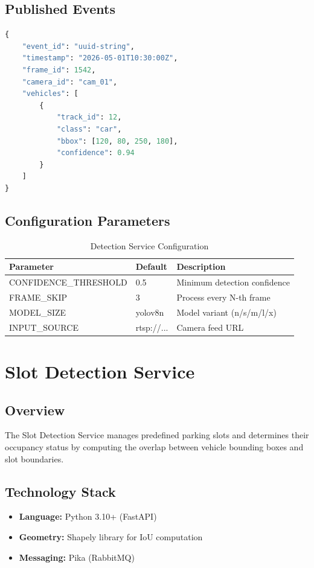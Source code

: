 \documentclass[12pt,a4paper]{report}
\begin{document}
\subsection{Published Events}
\begin{lstlisting}[language=Python, caption=vehicle.detected.v1 Event Schema]
{
    "event_id": "uuid-string",
    "timestamp": "2026-05-01T10:30:00Z",
    "frame_id": 1542,
    "camera_id": "cam_01",
    "vehicles": [
        {
            "track_id": 12,
            "class": "car",
            "bbox": [120, 80, 250, 180],
            "confidence": 0.94
        }
    ]
}
\end{lstlisting}

\subsection{Configuration Parameters}
\begin{table}[H]
\centering
\caption{Detection Service Configuration}
\begin{tabular}{|l|l|l|}
\hline
\textbf{Parameter} & \textbf{Default} & \textbf{Description} \\
\hline
CONFIDENCE\_THRESHOLD & 0.5 & Minimum detection confidence \\
\hline
FRAME\_SKIP & 3 & Process every N-th frame \\
\hline
MODEL\_SIZE & yolov8n & Model variant (n/s/m/l/x) \\
\hline
INPUT\_SOURCE & rtsp://... & Camera feed URL \\
\hline
\end{tabular}
\end{table}


\section{Slot Detection Service}

\subsection{Overview}
The Slot Detection Service manages predefined parking slots and determines their occupancy status by computing the overlap between vehicle bounding boxes and slot boundaries.

\subsection{Technology Stack}
\begin{itemize}
    \item \textbf{Language:} Python 3.10+ (FastAPI)
    \item \textbf{Geometry:} Shapely library for IoU computation
    \item \textbf{Messaging:} Pika (RabbitMQ)
\end{itemize}
\end{document}
